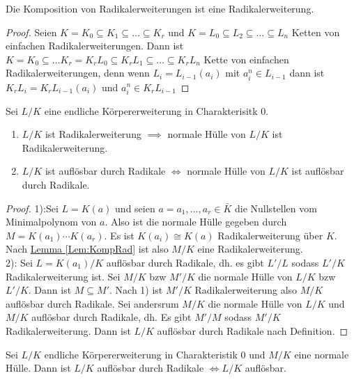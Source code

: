\begin{Lemma}
    Die Komposition von Radikalerweiterungen ist eine Radikalerweiterung.
\end{Lemma}\label{Lem:KompRad}
\begin{proof}
    Seien \(K=K_0\subseteq K_1\subseteq \dots \subseteq K_r\) und \(K=L_0\subseteq L_2\subseteq \dots \subseteq L_n\) Ketten von einfachen Radikalerweiterungen.
    Dann ist \(K=K_0\subseteq \dots K_r=K_rL_0\subseteq K_rL_1\subseteq\dots \subseteq K_rL_n\) Kette von einfachen Radikalerweiterungen, denn wenn \(L_i=L_{i-1}(a_i)\) mit \(a_i^n\in L_{i-1}\) dann ist \(K_rL_i=K_rL_{i-1}(a_i)\) und \(a_i^n\in K_rL_{i-1}\)
\end{proof}
\begin{Lemma}\label{Lem:AuflRad}
    Sei \(L/K\) eine endliche Körpererweiterung in Charakterisitk \(0\).
    \begin{enumerate}
        \item \(L/K\) ist Radikalerweiterung \(\implies \) normale Hülle von \(L/K\) ist Radikalerweiterung.
        \item \(L/K\) ist auflösbar durch Radikale \(\iff\) normale Hülle von \(L/K\) ist auflösbar durch Radikale.
    \end{enumerate}
\end{Lemma}
\begin{proof}
    1):Sei \(L=K(a)\) und seien \(a=a_1,\dots,a_r\in\bar K\) die Nullstellen vom Minimalpolynom von \(a\). Also ist die normale Hülle gegeben durch \(M=K(a_1)\cdots K(a_r)\).
    Es ist \(K(a_i)\cong K(a)\) Radikalerweiterung über \(K\). Nach \hyperref[Lem:KompRad]{Lemma \ref{Lem:KompRad}} ist also \(M/K\) eine Radikalerweiterung.\\
    2): Sei \(L=K(a_1)/K\) auflösbar durch Radikale, dh. es gibt \(L'/L\) sodass \(L'/K\) Radikalerweiterung ist. Sei \(M/K\) bzw \(M'/K\) die normale Hülle von \(L/K\) bzw \(L'/K\). Dann ist \(M\subseteq M'\). Nach 1) ist \(M'/K\) Radikalerweiterung also \(M/K\) auflösbar durch Radikale.
    Sei andersrum \(M/K\) die normale Hülle von \(L/K\) und \(M/K\) auflösbar durch Radikale, dh. Es gibt \(M'/M\) sodass \(M'/K\) Radikalerweiterung. Dann ist \(L/K\) auflösbar durch Radikale nach Definition.
\end{proof}
\begin{Satz}
    Sei \(L/K\) endliche Körpererweiterung in Charakteristik \(0\) und \(M/K\) eine normale Hülle. Dann ist \(L/K\) auflösbar durch Radikale \(\iff L/K\) auflösbar.
\end{Satz}
